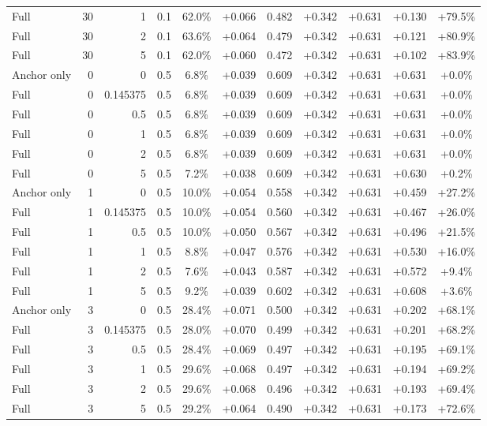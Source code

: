 \begin{table}[htbp]
\begin{tabular}{lrrrccccccc}
Full & 30 & 1 & 0.1 & 62.0\% & +0.066 & 0.482 & +0.342 & +0.631 & +0.130 & +79.5\% \\
Full & 30 & 2 & 0.1 & 63.6\% & +0.064 & 0.479 & +0.342 & +0.631 & +0.121 & +80.9\% \\
Full & 30 & 5 & 0.1 & 62.0\% & +0.060 & 0.472 & +0.342 & +0.631 & +0.102 & +83.9\% \\
Anchor only & 0 & 0 & 0.5 & 6.8\% & +0.039 & 0.609 & +0.342 & +0.631 & +0.631 & +0.0\% \\
Full & 0 & 0.145375 & 0.5 & 6.8\% & +0.039 & 0.609 & +0.342 & +0.631 & +0.631 & +0.0\% \\
Full & 0 & 0.5 & 0.5 & 6.8\% & +0.039 & 0.609 & +0.342 & +0.631 & +0.631 & +0.0\% \\
Full & 0 & 1 & 0.5 & 6.8\% & +0.039 & 0.609 & +0.342 & +0.631 & +0.631 & +0.0\% \\
Full & 0 & 2 & 0.5 & 6.8\% & +0.039 & 0.609 & +0.342 & +0.631 & +0.631 & +0.0\% \\
Full & 0 & 5 & 0.5 & 7.2\% & +0.038 & 0.609 & +0.342 & +0.631 & +0.630 & +0.2\% \\
Anchor only & 1 & 0 & 0.5 & 10.0\% & +0.054 & 0.558 & +0.342 & +0.631 & +0.459 & +27.2\% \\
Full & 1 & 0.145375 & 0.5 & 10.0\% & +0.054 & 0.560 & +0.342 & +0.631 & +0.467 & +26.0\% \\
Full & 1 & 0.5 & 0.5 & 10.0\% & +0.050 & 0.567 & +0.342 & +0.631 & +0.496 & +21.5\% \\
Full & 1 & 1 & 0.5 & 8.8\% & +0.047 & 0.576 & +0.342 & +0.631 & +0.530 & +16.0\% \\
Full & 1 & 2 & 0.5 & 7.6\% & +0.043 & 0.587 & +0.342 & +0.631 & +0.572 & +9.4\% \\
Full & 1 & 5 & 0.5 & 9.2\% & +0.039 & 0.602 & +0.342 & +0.631 & +0.608 & +3.6\% \\
Anchor only & 3 & 0 & 0.5 & 28.4\% & +0.071 & 0.500 & +0.342 & +0.631 & +0.202 & +68.1\% \\
Full & 3 & 0.145375 & 0.5 & 28.0\% & +0.070 & 0.499 & +0.342 & +0.631 & +0.201 & +68.2\% \\
Full & 3 & 0.5 & 0.5 & 28.4\% & +0.069 & 0.497 & +0.342 & +0.631 & +0.195 & +69.1\% \\
Full & 3 & 1 & 0.5 & 29.6\% & +0.068 & 0.497 & +0.342 & +0.631 & +0.194 & +69.2\% \\
Full & 3 & 2 & 0.5 & 29.6\% & +0.068 & 0.496 & +0.342 & +0.631 & +0.193 & +69.4\% \\
Full & 3 & 5 & 0.5 & 29.2\% & +0.064 & 0.490 & +0.342 & +0.631 & +0.173 & +72.6\% \\

\end{tabular}
\end{table}
